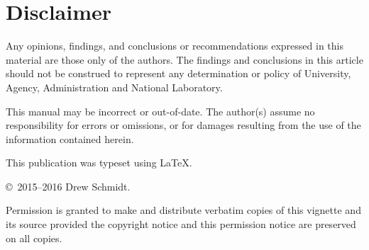 \section*{Disclaimer}
Any opinions, findings, and conclusions or recommendations expressed in this 
material are those only of the authors.  The findings and conclusions in this 
article should not be construed to represent any determination or policy of
University, Agency, Administration and National Laboratory.


This manual may be incorrect or out-of-date.  The author(s) assume
no responsibility for errors or omissions, or for damages resulting
from the use of the information contained herein.

This publication was typeset using \LaTeX.

\vfill

\null
\vfill
\copyright\ 2015--2016 Drew Schmidt.

Permission is granted to make and distribute verbatim copies of
this vignette and its source provided the copyright notice and
this permission notice are preserved on all copies.
